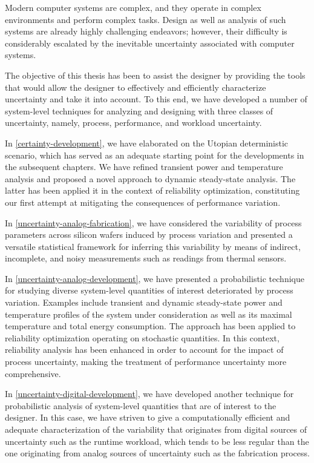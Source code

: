 Modern computer systems are complex, and they operate in complex environments
and perform complex tasks. Design as well as analysis of such systems are
already highly challenging endeavors; however, their difficulty is considerably
escalated by the inevitable uncertainty associated with computer systems.

The objective of this thesis has been to assist the designer by providing the
tools that would allow the designer to effectively and efficiently characterize
uncertainty and take it into account. To this end, we have developed a number of
system-level techniques for analyzing and designing with three classes of
uncertainty, namely, process, performance, and workload uncertainty.

In \cref{certainty-development}, we have elaborated on the Utopian deterministic
scenario, which has served as an adequate starting point for the developments in
the subsequent chapters. We have refined transient power and temperature
analysis and proposed a novel approach to dynamic steady-state analysis. The
latter has been applied it in the context of reliability optimization,
constituting our first attempt at mitigating the consequences of performance
variation.

In \cref{uncertainty-analog-fabrication}, we have considered the variability of
process parameters across silicon wafers induced by process variation and
presented a versatile statistical framework for inferring this variability by
means of indirect, incomplete, and noisy measurements such as readings from
thermal sensors.

In \cref{uncertainty-analog-development}, we have presented a probabilistic
technique for studying diverse system-level quantities of interest deteriorated
by process variation. Examples include transient and dynamic steady-state power
and temperature profiles of the system under consideration as well as its
maximal temperature and total energy consumption. The approach has been applied
to reliability optimization operating on stochastic quantities. In this context,
reliability analysis has been enhanced in order to account for the impact of
process uncertainty, making the treatment of performance uncertainty more
comprehensive.

In \cref{uncertainty-digital-development}, we have developed another technique
for probabilistic analysis of system-level quantities that are of interest to
the designer. In this case, we have striven to give a computationally efficient
and adequate characterization of the variability that originates from digital
sources of uncertainty such as the runtime workload, which tends to be less
regular than the one originating from analog sources of uncertainty such as the
fabrication process.

